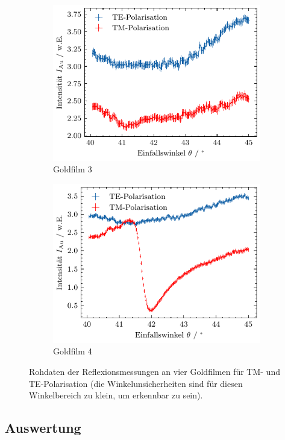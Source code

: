 \begin{figure}[H]
\begin{subfigure}{0.4\textwidth}
        \includegraphics[width=\linewidth]{../figs/au3_own}
        \caption{Goldfilm 3}
    \end{subfigure}
    \begin{subfigure}{0.4\textwidth}
        \centering
        \includegraphics[width=\linewidth]{../figs/au4_own}
        \caption{Goldfilm 4}
    \end{subfigure}
    \caption{Rohdaten der Reflexionsmessungen an vier Goldfilmen für TM- und TE-Polarisation (die Winkelunsicherheiten sind für diesen Winkelbereich zu klein, um erkennbar zu sein).}\label{fig:gold_own}
\end{figure}\newpage
\subsection{Auswertung}\label{subsec:teil1_auswertung}
